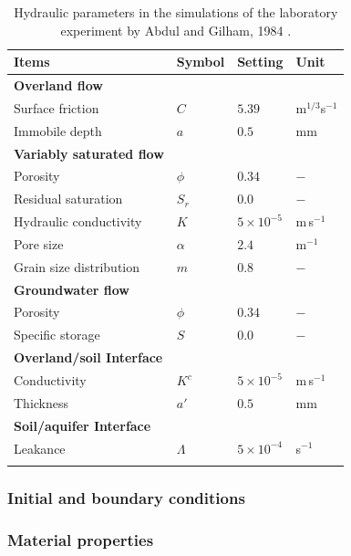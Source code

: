 \begin{table}[H]
 \centering
 \begin{tabular}{llll}
 \hline\hline\noalign{\smallskip}
 {\bf Items} & {\bf Symbol} & {\bf Setting} & {\bf Unit} \\ \hline \noalign{\smallskip}
{\bf Overland flow} & & & \\
 Surface friction  & $C$ & $5.39$ & m$^{1/3}$s$^{-1} $ \\
Immobile depth  & $a$ & $0.5$ & mm \\ \hline \noalign{\smallskip}
 {\bf Variably saturated flow} & & & \\
 Porosity             & $\phi$ & $0.34$ & $-$ \\
 Residual saturation & $S_r$ & $0.0$    &  $-$ \\
 Hydraulic conductivity & $K$ &  $5\times 10^{-5}$  & m$\, $s$^{-1}$\\
 Pore size   & $\alpha$ & $2.4$   &  m$^{-1}$ \\
 Grain size distribution & $m$ & $0.8$  &  $-$ \\ \hline \noalign{\smallskip}
 {\bf Groundwater flow} & & & \\
 Porosity             & $\phi$ & $0.34$ & $-$ \\
 Specific storage            & $S$ & $0.0$ & $-$ \\ \hline \noalign{\smallskip}
 {\bf Overland/soil Interface} & & & \\
 Conductivity  & $K^c$ & $5\times 10^{-5}$  & m$\, $s$^{-1}$\\
Thickness  & $a'$ & $0.5$ & mm \\
{\bf Soil/aquifer Interface} & & & \\
Leakance  & $\Lambda$ & $5\times 10^{-4}$  & s$^{-1}$\\
\noalign{\smallskip}\hline\hline
 \end{tabular}
\centering
 \caption{Hydraulic parameters in the simulations of the laboratory experiment by Abdul and Gilham, 1984 \cite{Abdul:84}.}
 \label{us:WoolhiserSetting}
\end{table}
%
\subsubsection*{Initial and boundary conditions}
%

%
\subsubsection*{Material properties}
%

